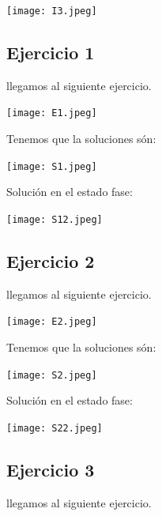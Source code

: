 \documentclass[12pt]{article}
\begin{document}
\begin{center}
    \texttt{[image: I3.jpeg]}
\end{center}
 



\subsection*{Ejercicio 1}
llegamos al siguiente ejercicio.

\begin{center}
    \texttt{[image: E1.jpeg]}
\end{center}

Tenemos que la soluciones són:

\begin{center}
    \texttt{[image: S1.jpeg]}
\end{center}

Solución en el estado fase:

\begin{center}
    \texttt{[image: S12.jpeg]}
\end{center}




\subsection*{Ejercicio 2}
llegamos al siguiente ejercicio.

\begin{center}
    \texttt{[image: E2.jpeg]}
\end{center}

Tenemos que la soluciones són:

\begin{center}
    \texttt{[image: S2.jpeg]}
\end{center}

Solución en el estado fase:

\begin{center}
    \texttt{[image: S22.jpeg]}
\end{center}




\subsection*{Ejercicio 3}
llegamos al siguiente ejercicio.
\end{document}
